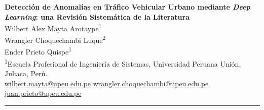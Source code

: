 \documentclass[12pt, a4paper]{article}
\begin{document}

\begin{center}
  {\LARGE\bfseries\color{azulPrincipal}
   Detecci\'{o}n de Anomal\'{i}as en Tr\'{a}fico Vehicular Urbano mediante \textit{Deep Learning}: una Revisi\'{o}n Sistem\'{a}tica de la Literatura}\\[1em]

  {\large Wilbert Alex Mayta Arotaype\textsuperscript{1}}\\[0.5em] {\large Wrangler Choquechambi Luque\textsuperscript{2}}\\[0.5em]{\large Ender Prieto Quispe\textsuperscript{1}}\\[0.5em]


  {\small
    \textsuperscript{1}Escuela Profesional de Ingenier\'{i}a de Sistemas,
    Universidad Peruana Uni\'{o}n, Juliaca, Per\'{u}.\\
    \href{mailto:wilbert.mayta@upeu.edu.pe}{wilbert.mayta@upeu.edu.pe}
    \href{mailto:glenen.choquechambi@upeu.edu.pe}{wrangler.choquechambi@upeu.edu.pe}
    \href{mailto:juan.prieto@upeu.edu.pe}{juan.prieto@upeu.edu.pe}
  }\\[0.8em]

\end{center}
\noindent\rule{\linewidth}{1pt}

\end{document}
